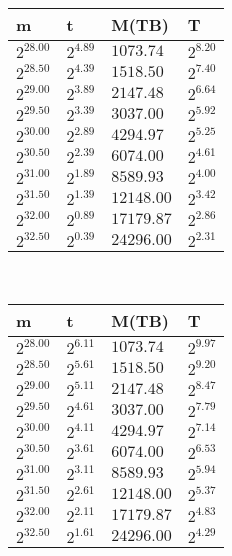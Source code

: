 \begin{tabular}{llll}
m & t & M(TB) & T \\ \hline
$2^{28.00}$ & $2^{4.89}$ & $1073.74$ & $2^{8.20}$ \\
$2^{28.50}$ & $2^{4.39}$ & $1518.50$ & $2^{7.40}$ \\
$2^{29.00}$ & $2^{3.89}$ & $2147.48$ & $2^{6.64}$ \\
$2^{29.50}$ & $2^{3.39}$ & $3037.00$ & $2^{5.92}$ \\
$2^{30.00}$ & $2^{2.89}$ & $4294.97$ & $2^{5.25}$ \\
$2^{30.50}$ & $2^{2.39}$ & $6074.00$ & $2^{4.61}$ \\
$2^{31.00}$ & $2^{1.89}$ & $8589.93$ & $2^{4.00}$ \\
$2^{31.50}$ & $2^{1.39}$ & $12148.00$ & $2^{3.42}$ \\
$2^{32.00}$ & $2^{0.89}$ & $17179.87$ & $2^{2.86}$ \\
$2^{32.50}$ & $2^{0.39}$ & $24296.00$ & $2^{2.31}$ \\
\end{tabular}
 \ 
\begin{tabular}{llll}
m & t & M(TB) & T \\ \hline
$2^{28.00}$ & $2^{6.11}$ & $1073.74$ & $2^{9.97}$ \\
$2^{28.50}$ & $2^{5.61}$ & $1518.50$ & $2^{9.20}$ \\
$2^{29.00}$ & $2^{5.11}$ & $2147.48$ & $2^{8.47}$ \\
$2^{29.50}$ & $2^{4.61}$ & $3037.00$ & $2^{7.79}$ \\
$2^{30.00}$ & $2^{4.11}$ & $4294.97$ & $2^{7.14}$ \\
$2^{30.50}$ & $2^{3.61}$ & $6074.00$ & $2^{6.53}$ \\
$2^{31.00}$ & $2^{3.11}$ & $8589.93$ & $2^{5.94}$ \\
$2^{31.50}$ & $2^{2.61}$ & $12148.00$ & $2^{5.37}$ \\
$2^{32.00}$ & $2^{2.11}$ & $17179.87$ & $2^{4.83}$ \\
$2^{32.50}$ & $2^{1.61}$ & $24296.00$ & $2^{4.29}$ \\
\end{tabular}
 \ 
